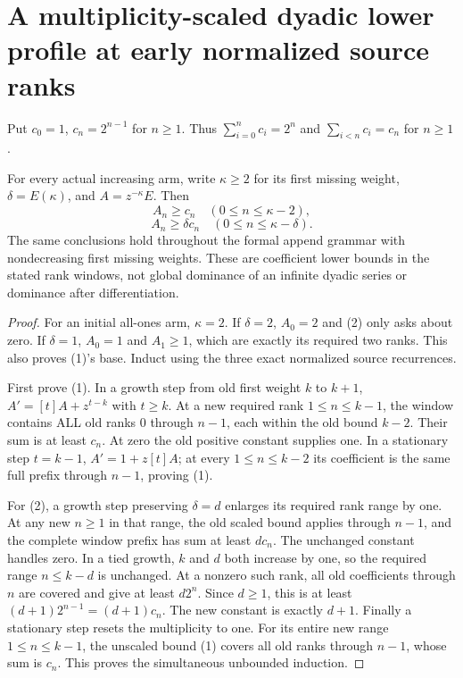 \section{A multiplicity-scaled dyadic lower profile at early normalized source ranks}
Put $c_0=1$, $c_n=2^{n-1}$ for $n\ge1$. Thus
$\sum_{i=0}^n c_i=2^n$ and $\sum_{i<n}c_i=c_n$ for $n\ge1$.

\begin{theorem}
For every actual increasing arm, write $\kappa\ge2$ for its first
missing weight, $\delta=E(\kappa)$, and $A=z^{-\kappa}E$.
Then
\[
 A_n\ge c_n\quad(0\le n\le\kappa-2),                 \tag{1}
\]
\[
 A_n\ge\delta c_n\quad(0\le n\le\kappa-\delta).       \tag{2}
\]
The same conclusions hold throughout the formal append grammar
with nondecreasing first missing weights. These are coefficient
lower bounds in the stated rank windows, not global dominance of
an infinite dyadic series or dominance after differentiation.
\end{theorem}
\begin{proof}
For an initial all-ones arm, $\kappa=2$. If $\delta=2$, $A_0=2$
and (2) only asks about zero. If $\delta=1$, $A_0=1$ and $A_1\ge1$,
which are exactly its required two ranks. This also proves (1)'s base.
Induct using the three exact normalized source recurrences.

First prove (1). In a growth step from old first weight $k$ to
$k+1$, $A'=[t]A+z^{t-k}$ with $t\ge k$. At a new required rank
$1\le n\le k-1$, the window contains ALL old ranks $0$ through
$n-1$, each within the old bound $k-2$. Their sum is at least $c_n$.
At zero the old positive constant supplies one. In a stationary
step $t=k-1$, $A'=1+z[t]A$; at every $1\le n\le k-2$ its
coefficient is the same full prefix through $n-1$, proving (1).

For (2), a growth step preserving $\delta=d$ enlarges its required
rank range by one. At any new $n\ge1$ in that range, the old
scaled bound applies through $n-1$, and the complete window prefix
has sum at least $dc_n$. The unchanged constant handles zero.
In a tied growth, $k$ and $d$ both increase by one, so the required
range $n\le k-d$ is unchanged. At a nonzero such rank, all old
coefficients through $n$ are covered and give at least $d2^n$.
Since $d\ge1$, this is at least $(d+1)2^{n-1}=(d+1)c_n$.
The new constant is exactly $d+1$.
Finally a stationary step resets the multiplicity to one. For its
entire new range $1\le n\le k-1$, the unscaled bound (1) covers
all old ranks through $n-1$, whose sum is $c_n$.
This proves the simultaneous unbounded induction.
\end{proof}

